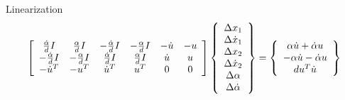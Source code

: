 \documentclass[10pt,dvips]{report}
\begin{document}
Linearization
\begin{displaymath}
        \sqbr{\matr{cccccc}{
		\frac{\dot{\alpha}}{d}I & \frac{\alpha}{d}I &
			-\frac{\dot{\alpha}}{d}I & -\frac{\alpha}{d}I &
			-\dot{u} & -u \\
		-\frac{\dot{\alpha}}{d}I & -\frac{\alpha}{d}I &
			\frac{\dot{\alpha}}{d}I & \frac{\alpha}{d}I &
			\dot{u} & u \\
		-\dot{u}^T & -u^T & \dot{u}^T & u^T & 0 & 0
	}}\cubr{\cvvect{
		\Delta{x_1} \\
		\Delta{\dot{x}_1} \\
		\Delta{x_2} \\
		\Delta{\dot{x}_2} \\
		\Delta{\alpha} \\
		\Delta{\dot{\alpha}}
	}} = \cubr{\cvvect{
		\alpha \dot{u} + \dot{\alpha} u \\
		-\alpha \dot{u} - \dot{\alpha} u \\
		d u^T \dot{u}
	}}
\end{displaymath}
\end{document}
